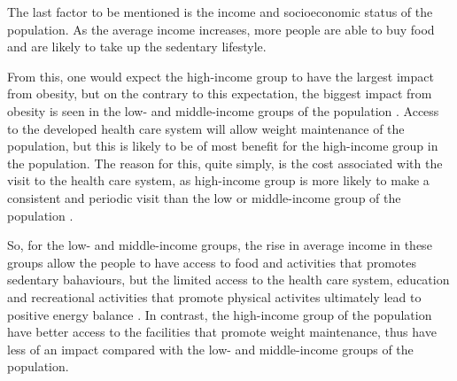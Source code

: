\noindent
The last factor to be mentioned is the income and socioeconomic status of the population.
As the average income increases, more people are able to buy food and are likely to take up the sedentary lifestyle.

From this, one would expect the high-income group to have the largest impact from obesity, but on the contrary to this expectation, the biggest impact from obesity is seen in the low- and middle-income groups of the population \citep{Malik2013}.
Access to the developed health care system will allow weight maintenance of the population, but this is likely to be of most benefit for the high-income group in the population.
The reason for this, quite simply, is the cost associated with the visit to the health care system, as high-income group is more likely to make a consistent and periodic visit than the low or middle-income group of the population \citep{Malik2013}.

So, for the low- and middle-income groups, the rise in average income in these groups allow the people to have access to food and activities that promotes sedentary bahaviours, but the limited access to the health care system, education and recreational activities that promote physical activites ultimately lead to positive energy balance \citep{Malik2013}.
In contrast, the high-income group of the population have better access to the facilities that promote weight maintenance, thus have less of an impact compared with the low- and middle-income groups of the population.
\\



